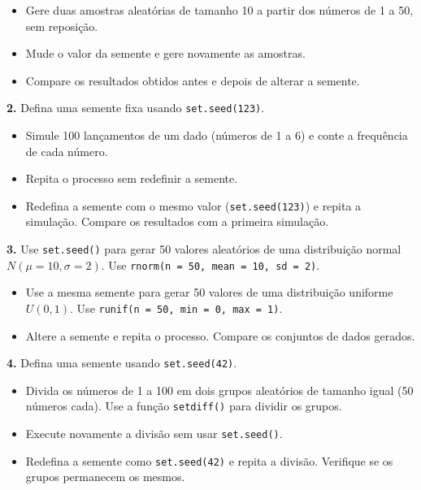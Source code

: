 \documentclass[
]{book}
\providecommand{\tightlist}{%
  \setlength{\itemsep}{0pt}\setlength{\parskip}{0pt}}
\begin{document}
\begin{itemize}
\tightlist
\item
  Gere duas amostras aleatórias de tamanho 10 a partir dos números de 1 a 50, sem reposição.
\item
  Mude o valor da semente e gere novamente as amostras.
\item
  Compare os resultados obtidos antes e depois de alterar a semente.
\end{itemize}

\textbf{2.} Defina uma semente fixa usando \texttt{set.seed(123)}.

\begin{itemize}
\tightlist
\item
  Simule 100 lançamentos de um dado (números de 1 a 6) e conte a frequência de cada número.
\item
  Repita o processo sem redefinir a semente.
\item
  Redefina a semente com o mesmo valor (\texttt{set.seed(123)}) e repita a simulação. Compare os resultados com a primeira simulação.
\end{itemize}

\textbf{3.} Use \texttt{set.seed()} para gerar 50 valores aleatórios de uma distribuição normal \(N(\mu=10, \sigma=2)\). Use \texttt{rnorm(n\ =\ 50,\ mean\ =\ 10,\ sd\ =\ 2)}.

\begin{itemize}
\tightlist
\item
  Use a mesma semente para gerar 50 valores de uma distribuição uniforme \(U(0, 1)\). Use \texttt{runif(n\ =\ 50,\ min\ =\ 0,\ max\ =\ 1)}.
\item
  Altere a semente e repita o processo. Compare os conjuntos de dados gerados.
\end{itemize}

\textbf{4.} Defina uma semente usando \texttt{set.seed(42)}.

\begin{itemize}
\tightlist
\item
  Divida os números de 1 a 100 em dois grupos aleatórios de tamanho igual (50 números cada). Use a função \texttt{setdiff()} para dividir os grupos.
\item
  Execute novamente a divisão sem usar \texttt{set.seed()}.
\item
  Redefina a semente como \texttt{set.seed(42)} e repita a divisão. Verifique se os grupos permanecem os mesmos.
\end{itemize}
\end{document}
